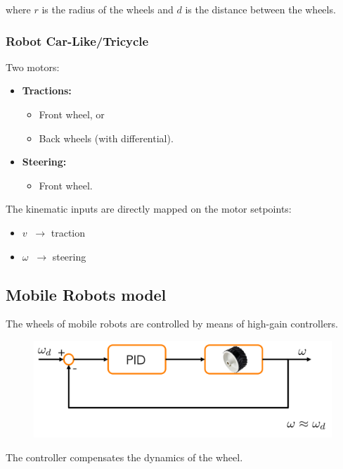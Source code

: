 where $r$ is the radius of the wheels and $d$ is the distance between the wheels.  

\hfill

\subsubsection{Robot Car-Like/Tricycle}

Two motors:
\begin{itemize}
    \item \textbf{Tractions:}
    \begin{itemize}
        \item Front wheel, or  
        \item Back wheels (with differential).  
    \end{itemize}
    \item \textbf{Steering:}
    \begin{itemize}
        \item Front wheel.  
    \end{itemize}
\end{itemize}

The kinematic inputs are directly mapped on the motor setpoints:
\begin{itemize}
    \item $v \;\; \rightarrow$ traction  
    \item $\omega \;\; \rightarrow$ steering  
\end{itemize}

\hfill

\subsection{Mobile Robots model}

The wheels of mobile robots are controlled by means of high-gain controllers.  

\begin{figure}[H]
    \centering
    \includegraphics[width=0.75\linewidth]{imgs/low_level_actuation_of_wheels.png}
\end{figure}

The controller compensates the dynamics of the wheel.  

